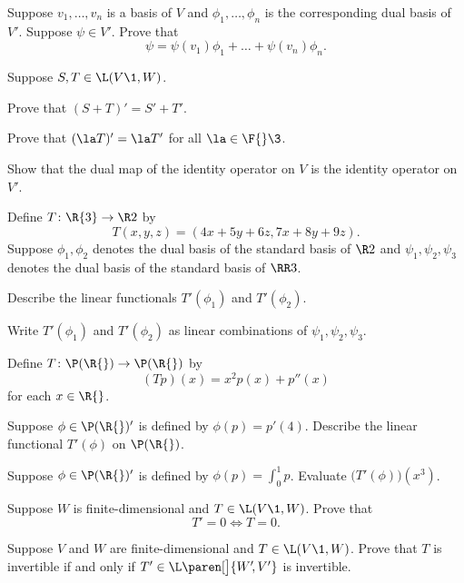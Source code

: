 \exercise
Suppose $v_1, \dots, v_n$ is a basis of $V$ and $\phi_1, \dots, \phi_n$ is the corresponding dual basis of $V'\!$. Suppose $\psi \in V'\!$. Prove that
\[
\psi = \psi(v_1) \phi_1 + \dots + \psi(v_n) \phi_n.
\]
\exercisedisplayend


\exercise
Suppose $S, T \in \L(V\1, W)$.
\begin{subtheorem}
\item
Prove that $(S + T)' = S' + T'\!$.
\item
Prove that $(\la T)' = \la T'$ for all $\la \in \F{}\3$.
\end{subtheorem}


\exercise
Show that the dual map of the identity operator on $V$ is the identity operator on~$V'\!$.


\exercise
Define $T \colon \R{3} \to \R2$ by
\[
T(x, y, z) = (4x + 5y + 6z, 7x + 8y + 9z).
\]
Suppose $\phi_1, \phi_2$ denotes the dual basis of the standard basis of $\R2$ and $\psi_1, \psi_2, \psi_3$ denotes the dual basis of the standard basis of $\RR3$.
\begin{subtheorem}
\item
Describe the linear functionals $T' \! (\phi_1)$ and $T' \! (\phi_2)$.
\item
Write $T' \! (\phi_1)$ and $T' \! (\phi_2)$ as linear combinations of $\psi_1, \psi_2, \psi_3$.
\end{subtheorem}
\exercisesubtheoremend


\exercise
Define $T \colon \P(\R{})\to \P(\R{})$ by
\[
(Tp)(x) = x^2 p(x) + p'' \! (x)
\]
for each $x \in \R{}$.
\begin{subtheorem}
\item
Suppose $\phi \in \P(\R{})'$ is defined by \mbox{$\phi(p) = p' \! (4)$}.
Describe the linear functional $T' \! (\phi)$ on $\P(\R{})$.
\item
Suppose $\phi \in \P(\R{})'$ is defined by
$
\phi(p) = \int_0^1 p$.
Evaluate $\bigl(T' \! (\phi)\bigr)(x^3)$.
\end{subtheorem}
\exercisesubtheoremend


\exercise
Suppose $W$ is finite-dimensional and $T \in \L(V\1, W)$. Prove that \label{Tprime}
\[
T' = 0 \iff T = 0.
\]
\exercisedisplayend


\exercise
Suppose $V$ and $W$ are finite-dimensional and $T \in \L(V\1, W)$. Prove that $T$ is invertible if and only if
$T' \in \L\paren[\big]{W'\!, V'}$ is invertible.


